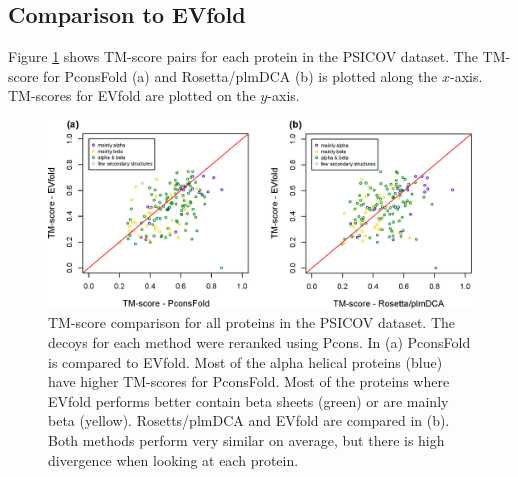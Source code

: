 \documentclass{bioinfo}
\begin{document}
\subsection{Comparison to EVfold}
Figure \ref{fig:vs} shows TM-score pairs for each protein in the PSICOV dataset. The TM-score for PconsFold (a) and Rosetta/plmDCA (b) is plotted along the $x$-axis. TM-scores for EVfold are plotted on the $y$-axis. 
\begin{figure}[!tpb]%
    \centerline{\includegraphics[scale=0.35]{figures/vs.eps}}
\caption{TM-score comparison for all proteins in the PSICOV dataset. The decoys for each method were reranked using Pcons. In (a) PconsFold is compared to EVfold. Most of the alpha helical proteins (blue) have higher TM-scores for PconsFold. Most of the proteins where EVfold performs better contain beta sheets (green) or are mainly beta (yellow). Rosetts/plmDCA and EVfold are compared in (b). Both methods perform very similar on average, but there is high divergence when looking at each protein.}\label{fig:vs}
\end{figure}
\end{document}
